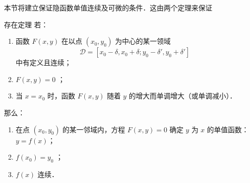 
本节将建立保证隐函数单值连续及可微的条件．这由两个定理来保证
\begin{theorem}{存在定理}
若：\begin{enumerate}
\item 函数 $F(x,y)$ 在以点 $(x_0,y_0)$ 为中心的某一领域
\begin{equation}
\mathcal{D}=[x_0-\delta,x_0+\delta;y_0-\delta',y_0+\delta']
\end{equation}
中有定义且连续；
\item $F(x,y)=0$ ；
\item 当 $x=x_0$ 时，函数 $F(x,y)$ 随着 $y$ 的增大而单调增大（或单调减小）．
\end{enumerate}
那么：
\begin{enumerate}
\item 在点 $(x_0,y_0)$ 的某一邻域内，方程 $F(x,y)=0$ 确定 $y$ 为 $x$ 的单值函数： $y=f(x)$；
\item $f(x_0)=y_0$ ；
\item $f(x)$ 连续．
\end{enumerate}

\end{theorem}